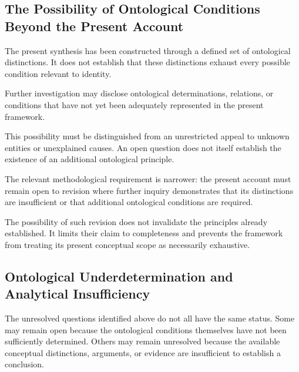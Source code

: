 
\subsection{The Possibility of Ontological Conditions Beyond the Present Account}

The present synthesis has been constructed through
a defined set of ontological distinctions. It does not
establish that these distinctions exhaust every possible
condition relevant to identity.

Further investigation may disclose ontological
determinations, relations, or conditions that have not
yet been adequately represented in the present
framework.

This possibility must be distinguished from an
unrestricted appeal to unknown entities or unexplained
causes. An open question does not itself establish
the existence of an additional ontological principle.

The relevant methodological requirement is narrower:
the present account must remain open to revision
where further inquiry demonstrates that its distinctions
are insufficient or that additional ontological
conditions are required.

The possibility of such revision does not invalidate
the principles already established. It limits their
claim to completeness and prevents the framework
from treating its present conceptual scope as
necessarily exhaustive.


\subsection{Ontological Underdetermination and Analytical Insufficiency}

The unresolved questions identified above do not all
have the same status. Some may remain open because
the ontological conditions themselves have not been
sufficiently determined. Others may remain unresolved
because the available conceptual distinctions, arguments,
or evidence are insufficient to establish a conclusion.


